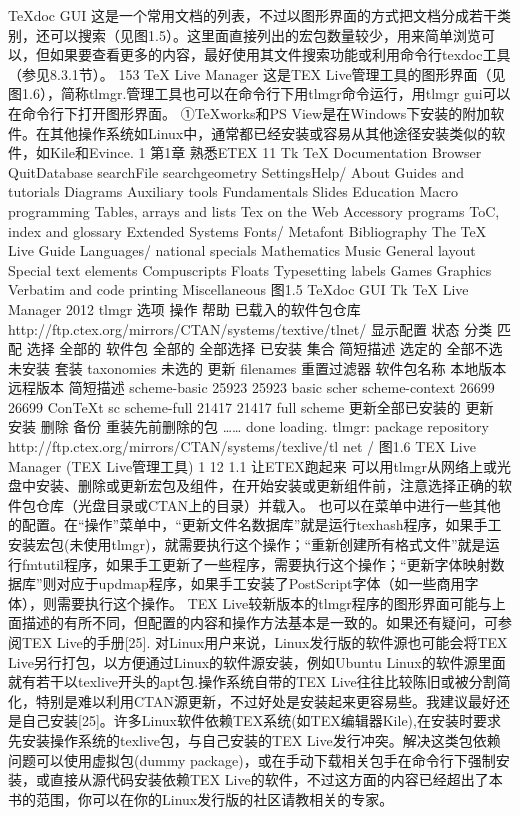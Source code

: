 \documentclass[UTF8]{ctexart}
\begin{document}
TeXdoc GUI
这是一个常用文档的列表，不过以图形界面的方式把文档分成若干类别，还可以搜索（见图1.5）。这里面直接列出的宏包数量较少，用来简单浏览可以，但如果要查看更多的内容，最好使用其文件搜索功能或利用命令行texdoc工具（参见8.3.1节）。
153	TeX Live Manager
这是TEX Live管理工具的图形界面（见图1.6），简称tlmgr.管理工具也可以在命令行下用tlmgr命令运行，用tlmgr gui可以在命令行下打开图形界面。
①TeXworks和PS View是在Windows下安装的附加软件。在其他操作系统如Linux中，通常都已经安装或容易从其他途径安装类似的软件，如Kile和Evince.
1
第1章	熟悉ETEX	11
Tk TeX Documentation Browser
QuitDatabase searchFile searchgeometry	SettingsHelp/ About
Guides and tutorials	Diagrams	Auxiliary tools
Fundamentals	Slides	Education
Macro programming	Tables, arrays and lists	Tex on the Web
Accessory programs	ToC, index and glossary	Extended Systems
Fonts/ Metafont	Bibliography	The TeX Live Guide
Languages/ national specials	Mathematics	Music
General layout	Special text elements	Compuscripts
Floats	Typesetting labels	Games
Graphics	Verbatim and code printing	Miscellaneous
图1.5 TeXdoc GUI
Tk TeX Live Manager 2012
tlmgr
选项
操作
帮助
已载入的软件包仓库
http://ftp.ctex.org/mirrors/CTAN/systems/textive/tlnet/
显示配置
状态
分类
匹配
选择
全部的
软件包
全部的
全部选择
已安装
集合
简短描述
选定的
全部不选
未安装
套装
taxonomies
未选的
更新
filenames
重置过滤器
软件包名称
本地版本
远程版本
简短描述
scheme-basic
25923
25923
basic scher
scheme-context
26699
26699
ConTeXt sc
scheme-full
21417
21417
full scheme
更新全部已安装的
更新
安装
删除
备份
重装先前删除的包
…… done loading.
tlmgr: package repository
http://ftp.ctex.org/mirrors/CTAN/systems/texlive/tl
net
/
图1.6 TEX Live Manager (TEX Live管理工具)
1
12	1.1 让ETEX跑起来
可以用tlmgr从网络上或光盘中安装、删除或更新宏包及组件，在开始安装或更新组件前，注意选择正确的软件包仓库（光盘目录或CTAN上的目录）并载入。
也可以在菜单中进行一些其他的配置。在“操作”菜单中，“更新文件名数据库”就是运行texhash程序，如果手工安装宏包(未使用tlmgr)，就需要执行这个操作；“重新创建所有格式文件”就是运行fmtutil程序，如果手工更新了一些程序，需要执行这个操作；“更新字体映射数据库”则对应于updmap程序，如果手工安装了PostScript字体（如一些商用字体），则需要执行这个操作。
TEX Live较新版本的tlmgr程序的图形界面可能与上面描述的有所不同，但配置的内容和操作方法基本是一致的。如果还有疑问，可参阅TEX Live的手册[25].
对Linux用户来说，Linux发行版的软件源也可能会将TEX Live另行打包，以方便通过Linux的软件源安装，例如Ubuntu Linux的软件源里面就有若干以texlive开头的apt包.操作系统自带的TEX Live往往比较陈旧或被分割简化，特别是难以利用CTAN源更新，不过好处是安装起来更容易些。我建议最好还是自己安装[25]。许多Linux软件依赖TEX系统(如TEX编辑器Kile),在安装时要求先安装操作系统的texlive包，与自己安装的TEX Live发行冲突。解决这类包依赖问题可以使用虚拟包(dummy package)，或在手动下载相关包手在命令行下强制安装，或直接从源代码安装依赖TEX Live的软件，不过这方面的内容已经超出了本书的范围，你可以在你的Linux发行版的社区请教相关的专家。
\end{document}
